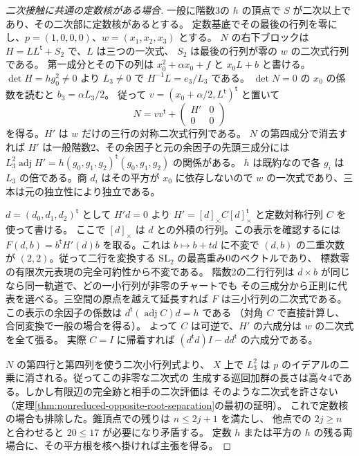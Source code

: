 \begin{proof}[二次接触に共通の定数核がある場合]
一般に階数3の $h$ の頂点で $S$ が二次以上であり、その二次部に定数核があるとする。
定数基底でその最後の行列を零にし、$p=(1,0,0,0)$、$w=(x_1,x_2,x_3)$ とする。
$N$ の右下ブロックは $H=L L^{\mathsf t}+S_2$ で、$L$ は三つの一次式、
$S_2$ は最後の行列が零の $w$ の二次式行列である。
第一成分とその下の列は $x_0^2+\alpha x_0+f$ と $x_0L+b$ と書ける。
$\det H=h g_0^2\ne0$ より $L_3\ne0$ で $H^{-1}L=e_3/L_3$ である。
$\det N=0$ の $x_0$ の係数を読むと $b_3=\alpha L_3/2$。
従って $v=(x_0+\alpha/2,L^{\mathsf t})^{\mathsf t}$ と置いて
\[
 N=vv^{\mathsf t}+\begin{pmatrix}H'&0\\0&0\end{pmatrix}
\]
を得る。$H'$ は $w$ だけの三行の対称二次式行列である。
$N$ の第四成分で消去すれば $H'$ は一般階数2、その余因子と元の余因子の先頭三成分には
$L_3^2\operatorname{adj}H'=h(g_0,g_1,g_2)^{\mathsf t}(g_0,g_1,g_2)$ の関係がある。
$h$ は既約なので各 $g_i$ は $L_3$ の倍である。商 $d_i$ はその平方が
$x_0$ に依存しないので $w$ の一次式であり、三本は元の独立性により独立である。

$d=(d_0,d_1,d_2)^{\mathsf t}$ として $H'd=0$ より
$H'=[d]_\times C[d]_\times^{\mathsf t}$ と定数対称行列 $C$ を使って書ける。
ここで $[d]_\times$ は $d$ との外積の行列。この表示を確認するには
$F(d,b)=b^{\mathsf t}H'(d)b$ を取る。これは $b\mapsto b+td$ に不変で
$(d,b)$ の二重次数が $(2,2)$。従って二行を変換する $\mathrm{SL}_2$ の最高重み0のベクトルであり、
標数零の有限次元表現の完全可約性から不変である。
階数2の二行行列は $d\times b$ が同じなら同一軌道で、どの一小行列が非零のチャートでも
その三成分から正則に代表を選べる。三空間の原点を越えて延長すれば $F$ は三小行列の二次式である。
この表示の余因子の係数は $d^{\mathsf t}(\operatorname{adj} C)d=h$ である
（対角 $C$ で直接計算し、合同変換で一般の場合を得る）。
よって $C$ は可逆で、$H'$ の六成分は $w$ の二次式を全て張る。
実際 $C=I$ に帰着すれば $(d^{\mathsf t}d)I-dd^{\mathsf t}$ の六成分である。

$N$ の第四行と第四列を使う二次小行列式より、
$X$ 上で $L_3^2$ は $p$ のイデアルの二乗に消される。従ってこの非零な二次式の
生成する巡回加群の長さは高々4である。しかし有限辺の完全跡と相手の二次評価は
そのような二次式を許さない（定理\ref{thm:nonreduced-opposite-root-separation}の最初の証明）。
これで定数核の場合も排除した。錐頂点での残りは $n\le2j+1$ を満たし、
他点での $2j\ge n$ と合わせると $20\le17$ が必要になり矛盾する。
定数 $h$ または平方の $h$ の残る両場合に、その平方根を核へ掛ければ主張を得る。
\end{proof}
